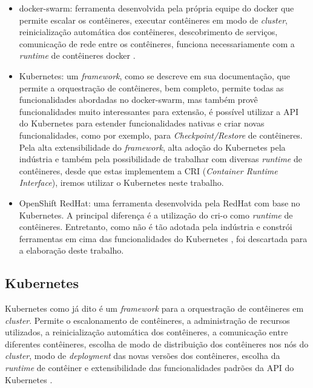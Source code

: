\begin{itemize}
    \item docker-swarm: ferramenta desenvolvida pela própria equipe do docker que
    permite escalar os contêineres, executar contêineres em modo de \textit{cluster},
    reinicialização automática dos contêineres, descobrimento de serviços,
    comunicação de rede entre os contêineres, funciona necessariamente com a
    \textit{runtime} de contêineres docker \cite{docker-swarm}.
    \item Kubernetes: um \textit{framework}, como se descreve em sua documentação,
    que permite a orquestração de contêineres, bem completo, permite todas as
    funcionalidades abordadas no docker-swarm, mas também provê funcionalidades
    muito interessantes para extensão, é possível utilizar a API do Kubernetes para
    estender funcionalidades nativas e criar novas funcionalidades, como por exemplo,
    para \textit{Checkpoint/Restore} de contêineres. Pela alta extensibilidade do
    \textit{framework}, alta adoção do Kubernetes pela indústria
    \cite{kubernetes:usage} e também pela possibilidade de trabalhar com diversas
    \textit{runtime} de contêineres, desde que estas implementem a CRI
    (\textit{Container Runtime Interface}), iremos utilizar o Kubernetes neste trabalho. 
    \item OpenShift RedHat: uma ferramenta desenvolvida pela RedHat com base no
    Kubernetes. A principal diferença é a utilização do cri-o como \textit{runtime}
    de contêineres. Entretanto, como não é tão adotada pela indústria e constrói
    ferramentas em cima das funcionalidades do Kubernetes \cite{openshift}, foi
    descartada para a elaboração deste trabalho.
\end{itemize}

\subsection{Kubernetes}

Kubernetes como já dito é um \textit{framework} para a orquestração de
contêineres em \textit{cluster}. Permite o escalonamento de contêineres,
a administração de recursos utilizados, a reinicialização automática dos
contêineres, a comunicação entre diferentes contêineres, escolha de modo
de distribuição dos contêineres nos nós do \textit{cluster}, modo de
\textit{deployment} das novas versões dos contêineres, escolha da
\textit{runtime} de contêiner e extensibilidade das funcionalidades
padrões da API do Kubernetes \cite{kubernetes}.

